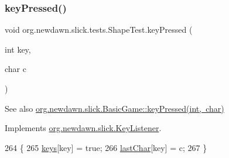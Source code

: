 \mbox{\label{classorg_1_1newdawn_1_1slick_1_1tests_1_1_shape_test_ab835ed469d21abeff031aa2c0e378bb7}} 
\subsubsection{\texorpdfstring{key\+Pressed()}{keyPressed()}}
{\footnotesize\ttfamily void org.\+newdawn.\+slick.\+tests.\+Shape\+Test.\+key\+Pressed (\begin{DoxyParamCaption}\item[{int}]{key,  }\item[{char}]{c }\end{DoxyParamCaption})\hspace{0.3cm}{\ttfamily [inline]}}

\begin{DoxySeeAlso}{See also}
\mbox{\hyperlink{classorg_1_1newdawn_1_1slick_1_1_basic_game_a4fbb3345b5abf5ddd54a99466d07f02f}{org.\+newdawn.\+slick.\+Basic\+Game\+::key\+Pressed(int, char)}} 
\end{DoxySeeAlso}


Implements \mbox{\hyperlink{interfaceorg_1_1newdawn_1_1slick_1_1_key_listener_ac0b0568a21ef486c4f51382614c196ef}{org.\+newdawn.\+slick.\+Key\+Listener}}.


\begin{DoxyCode}
264                                             \{
265         \mbox{\hyperlink{classorg_1_1newdawn_1_1slick_1_1tests_1_1_shape_test_abd8d1f480191272d0dc2ad5c9afe14fc}{keys}}[key] = \textcolor{keyword}{true};
266         \mbox{\hyperlink{classorg_1_1newdawn_1_1slick_1_1tests_1_1_shape_test_aa11ba24feb162758d3f48efbab64f26a}{lastChar}}[key] = c;
267     \}
\end{DoxyCode}
\mbox{\label{classorg_1_1newdawn_1_1slick_1_1tests_1_1_shape_test_a9fe0925a1f2298dc0e2d64f51da6459a}} 
